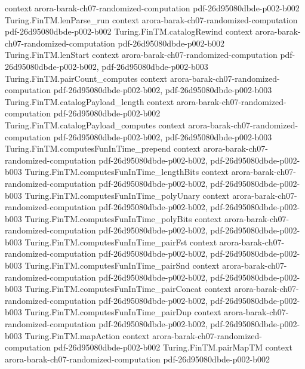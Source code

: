\begin{theorem}
  {context}
  {arora-barak-ch07-randomized-computation}
  {pdf-26d95080dbde-p002-b002}
\proofstep
  {Turing.FinTM.lenParse_run}
  {context}
  {arora-barak-ch07-randomized-computation}
  {pdf-26d95080dbde-p002-b002}
\proofstep
  {Turing.FinTM.catalogRewind}
  {context}
  {arora-barak-ch07-randomized-computation}
  {pdf-26d95080dbde-p002-b002}
\proofstep
  {Turing.FinTM.lenStart}
  {context}
  {arora-barak-ch07-randomized-computation}
  {pdf-26d95080dbde-p002-b002,
    pdf-26d95080dbde-p002-b003}
\proofstep
  {Turing.FinTM.pairCount_computes}
  {context}
  {arora-barak-ch07-randomized-computation}
  {pdf-26d95080dbde-p002-b002,
    pdf-26d95080dbde-p002-b003}
\proofstep
  {Turing.FinTM.catalogPayload_length}
  {context}
  {arora-barak-ch07-randomized-computation}
  {pdf-26d95080dbde-p002-b002}
\proofstep
  {Turing.FinTM.catalogPayload_computes}
  {context}
  {arora-barak-ch07-randomized-computation}
  {pdf-26d95080dbde-p002-b002,
    pdf-26d95080dbde-p002-b003}
\proofstep
  {Turing.FinTM.computesFunInTime_prepend}
  {context}
  {arora-barak-ch07-randomized-computation}
  {pdf-26d95080dbde-p002-b002,
    pdf-26d95080dbde-p002-b003}
\proofstep
  {Turing.FinTM.computesFunInTime_lengthBits}
  {context}
  {arora-barak-ch07-randomized-computation}
  {pdf-26d95080dbde-p002-b002,
    pdf-26d95080dbde-p002-b003}
\proofstep
  {Turing.FinTM.computesFunInTime_polyUnary}
  {context}
  {arora-barak-ch07-randomized-computation}
  {pdf-26d95080dbde-p002-b002,
    pdf-26d95080dbde-p002-b003}
\proofstep
  {Turing.FinTM.computesFunInTime_polyBits}
  {context}
  {arora-barak-ch07-randomized-computation}
  {pdf-26d95080dbde-p002-b002,
    pdf-26d95080dbde-p002-b003}
\proofstep
  {Turing.FinTM.computesFunInTime_pairFst}
  {context}
  {arora-barak-ch07-randomized-computation}
  {pdf-26d95080dbde-p002-b002,
    pdf-26d95080dbde-p002-b003}
\proofstep
  {Turing.FinTM.computesFunInTime_pairSnd}
  {context}
  {arora-barak-ch07-randomized-computation}
  {pdf-26d95080dbde-p002-b002,
    pdf-26d95080dbde-p002-b003}
\proofstep
  {Turing.FinTM.computesFunInTime_pairConcat}
  {context}
  {arora-barak-ch07-randomized-computation}
  {pdf-26d95080dbde-p002-b002,
    pdf-26d95080dbde-p002-b003}
\proofstep
  {Turing.FinTM.computesFunInTime_pairDup}
  {context}
  {arora-barak-ch07-randomized-computation}
  {pdf-26d95080dbde-p002-b002,
    pdf-26d95080dbde-p002-b003}
\proofstep
  {Turing.FinTM.mapAction}
  {context}
  {arora-barak-ch07-randomized-computation}
  {pdf-26d95080dbde-p002-b002}
\proofstep
  {Turing.FinTM.pairMapTM}
  {context}
  {arora-barak-ch07-randomized-computation}
  {pdf-26d95080dbde-p002-b002}

\end{theorem}
